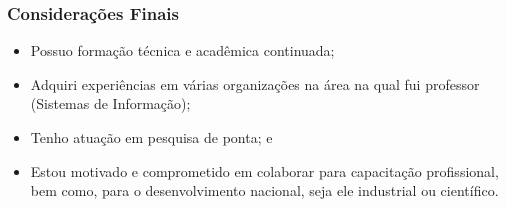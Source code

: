 \documentclass[aspectratio=169]{beamer}
\begin{document}
\begin{frame}
	\frametitle{Considerações Finais}

	\begin{itemize}
		\item Possuo formação técnica e acadêmica continuada;
		\item Adquiri experiências em várias organizações na área na qual fui
		professor (Sistemas de Informação);
		\item Tenho atuação em pesquisa de ponta; e
		\item Estou motivado e comprometido em colaborar para capacitação
		profissional, bem como, para o desenvolvimento nacional, seja ele industrial ou científico.
	\end{itemize}
\end{frame}
\end{document}
